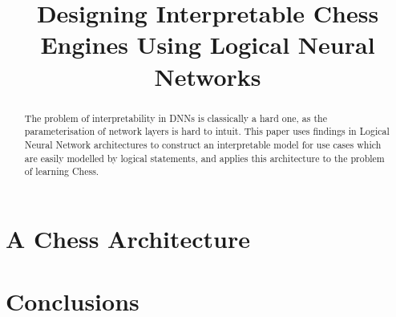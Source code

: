 \documentclass[conference]{report}
\begin{document}


\def\custop#1{{\mspace{4mu}#1\mspace{4mu}}}
\def\concat{\custop{@}}

\title{\LARGE Designing Interpretable Chess Engines Using Logical Neural Networks}

\maketitle
\thispagestyle{plain}
\pagestyle{plain}

\begin{abstract}
The problem of interpretability in DNNs is classically a hard one, as the parameterisation of network layers is hard to intuit. This paper uses findings in Logical Neural Network architectures to construct an interpretable model for use cases which are easily modelled by logical statements, and applies this architecture to the problem of learning Chess.  
\end{abstract}

\tableofcontents

\pagebreak


 


\chapter{A Chess Architecture}

\chapter{Conclusions}
 






\end{document}
